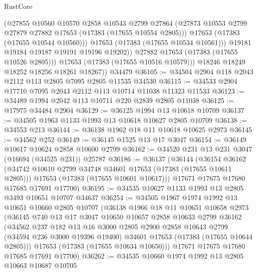 \begin{lexlean}{RustCore}
\begin{coremodule}
                  (@27855
                    @10560
                    @10570
                    @2858
                    @10543
                    @2799
                    @27864
                    (@27873 @10553 @2799 @27879 @27882 @17653 (@17383 (@17655 @10554 @2805)))
                    @17653
                    (@17383 (@17655 @10544 @10560)))
                  @17653
                  (@17383 (@17655 @10534 @10561)))
                @19181
                @19184
                @19187
                @19191
                @19196
                @19202))
            @27882
            @17653
            (@17383 (@17655 @10526 @2805)))
          @17653
          (@17383 (@17655 @10516 @10579)))
        @18246
        @18249
        @18252
        @18256
        @18261
        @18267))
    @34479
@36105 := @34504 @2904 @118 @2043 @2112 @113 @2805 @7095 @2805 @11535 @34530
@36115 := @34533 @2904 @17710 @7095 @2043 @2112 @113 @10714 @11038 @11323 @11533
@36123 := @34489 @1994 @2042 @113 @10711 @220 @2839 @2805 @11038
@36125 := @17975 @34484 @2904
@36129 := @36125 @1994 @13 @10618 @10709
@36137 := @34505 @1963 @1133 @1993 @13 @10618 @10627 @2805 @10709
@36138 := @34553 @213
@36144 := @36138 @1962 @18 @11 @10618 @10625 @2973
@36145 := @34562 @252
@36149 := @36145 @1525 @13 @17 @3047
@36154 := @36149 @10617 @10624 @2858 @10600 @2799
@36162 := @34520 @231 @13 @231 @3047 (@16694 (@34525 @231)) @25787
@36186 := @36137
    (@36144
      (@36154
        @36162
        (@34742 @10610 @2799 @34748 @34601 @17653 (@17383 (@17655 @10611 @2805)))
        @17653
        (@17383 (@17655 @10601 @10617)))
      @17671
      @17675
      @17680
      @17685
      @17691
      @17700)
@36195 := @34535 @10627 @1133 @1993 @13 @2805 @3493 @10651 @10707 @34637
@36254 := @34505
    @1967
    @1974
    @1992
    @13
    @10651
    @10660
    @2805
    @10707
    (@36138
      @1966
      @18
      @11
      @10651
      @10658
      @2973
      (@36145
        @740
        @13
        @17
        @3047
        @10650
        @10657
        @2858
        @10633
        @2799
        @36162
        (@34562
          @237
          @182
          @13
          @16
          @3000
          @2805
          @2900
          @2858
          @10643
          @2799
          (@34594 @236 @3000 @19396 @19400)
          @34601
          @17653
          (@17383 (@17655 @10644 @2805)))
        @17653
        (@17383 (@17655 @10634 @10650)))
      @17671
      @17675
      @17680
      @17685
      @17691
      @17700)
@36262 := @34535 @10660 @1974 @1992 @13 @2805 @10663 @10687 @10705

\end{coremodule}
\end{lexlean}
